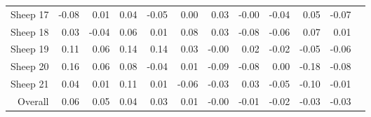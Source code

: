 \begin{table}[htp]
\begin{tabular}{rrrrrrrrrrrr}
Sheep  17   & -0.08 & 0.01 & 0.04 & -0.05 & 0.00 & 0.03 & -0.00 & -0.04 & 0.05 & -0.07 \\ 
Sheep  18   & 0.03 & -0.04 & 0.06 & 0.01 & 0.08 & 0.03 & -0.08 & -0.06 & 0.07 & 0.01 \\ 
Sheep  19   & 0.11 & 0.06 & 0.14 & 0.14 & 0.03 & -0.00 & 0.02 & -0.02 & -0.05 & -0.06 \\ 
Sheep  20   & 0.16 & 0.06 & 0.08 & -0.04 & 0.01 & -0.09 & -0.08 & 0.00 & -0.18 & -0.08 \\ 
Sheep  21   & 0.04 & 0.01 & 0.11 & 0.01 & -0.06 & -0.03 & 0.03 & -0.05 & -0.10 & -0.01 \\ 
   \hline
Overall & 0.06 & 0.05 & 0.04 & 0.03 & 0.01 & -0.00 & -0.01 & -0.02 & -0.03 & -0.03 \\ \hline
\end{tabular}
\end{table}
